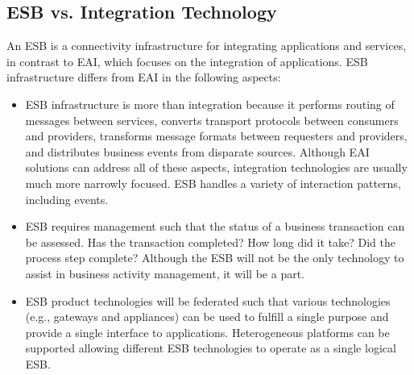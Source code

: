 \documentclass[12pt,a4paper,final,twoside,onecolumn,titlepage]{book}
\begin{document}
\subsection{ESB vs. Integration Technology}
An ESB is a connectivity infrastructure for integrating applications and services, in contrast to \gls{EAI}, which focuses on the integration of applications. ESB infrastructure differs from \gls{EAI} in the following aspects:
\begin{itemize}
\item ESB infrastructure is more than integration because it performs routing of messages between services, converts transport protocols between consumers and providers, transforms message formats between requesters and providers, and distributes
business events from disparate sources. Although \gls{EAI} solutions can address all of these aspects, integration technologies are usually much more narrowly focused. ESB handles a variety of interaction patterns, including events.
\item ESB requires management such that the status of a business transaction can be assessed. Has the transaction completed? How long did it take? Did the process step complete? Although the ESB will not be the only technology to assist in business activity management, it will be a part.
\item ESB product technologies will be federated such that various technologies (e.g., gateways and appliances) can be used to fulfill a single purpose and provide a single interface to applications. Heterogeneous platforms can be supported allowing different ESB technologies to operate as a single logical ESB.
\end{itemize}
\end{document}
